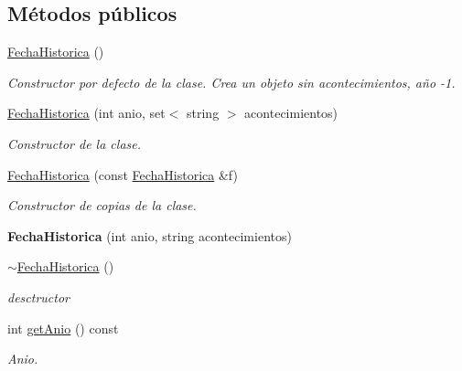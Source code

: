 \subsection*{Métodos públicos}
\begin{DoxyCompactItemize}
\item 
\mbox{\label{classFechaHistorica_a35baa09e365240e567049a7e33a7c209}} 
\hyperlink{classFechaHistorica_a35baa09e365240e567049a7e33a7c209}{Fecha\+Historica} ()
\begin{DoxyCompactList}\small\item\em Constructor por defecto de la clase. Crea un objeto sin acontecimientos, año -\/1. \end{DoxyCompactList}\item 
\hyperlink{classFechaHistorica_a45055b37912e7ff4c9cafb4240c45bce}{Fecha\+Historica} (int anio, set$<$ string $>$ acontecimientos)
\begin{DoxyCompactList}\small\item\em Constructor de la clase. \end{DoxyCompactList}\item 
\hyperlink{classFechaHistorica_a40a9c133a139d41bf84406e09022feaf}{Fecha\+Historica} (const \hyperlink{classFechaHistorica}{Fecha\+Historica} \&f)
\begin{DoxyCompactList}\small\item\em Constructor de copias de la clase. \end{DoxyCompactList}\item 
\mbox{\label{classFechaHistorica_a9f59bbce6efcde7d63de27ca656219aa}} 
{\bfseries Fecha\+Historica} (int anio, string acontecimientos)
\item 
\mbox{\label{classFechaHistorica_a634de6e216261ee47721922692d2934f}} 
\hyperlink{classFechaHistorica_a634de6e216261ee47721922692d2934f}{$\sim$\+Fecha\+Historica} ()
\begin{DoxyCompactList}\small\item\em desctructor \end{DoxyCompactList}\item 
int \hyperlink{classFechaHistorica_ad4f18ae887d020e9fc8132de8514f7ec}{get\+Anio} () const
\begin{DoxyCompactList}\small\item\em Anio. \end{DoxyCompactList}\item 

\end{DoxyCompactItemize}
